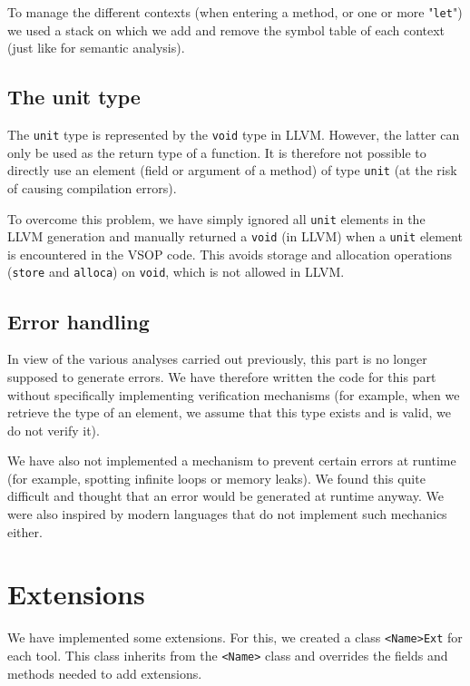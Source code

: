 \documentclass[a4paper, 12pt]{article}
\begin{document}
    To manage the different contexts (when entering a method, or one or more "\texttt{let}") we used a stack on which we add and remove the symbol table of each context (just like for semantic analysis).
    
    \subsection{The unit type}
    
    The \texttt{unit} type is represented by the \texttt{void} type in LLVM. However, the latter can only be used as the return type of a function. It is therefore not possible to directly use an element (field or argument of a method) of type \texttt{unit} (at the risk of causing compilation errors).
    
    To overcome this problem, we have simply ignored all \texttt{unit} elements in the LLVM generation and manually returned a \texttt{void} (in LLVM) when a \texttt{unit} element is encountered in the VSOP code. This avoids storage and allocation operations (\texttt{store} and \texttt{alloca}) on \texttt{void}, which is not allowed in LLVM.
    
    \subsection{Error handling}
    
    In view of the various analyses carried out previously, this part is no longer supposed to generate errors. We have therefore written the code for this part without specifically implementing verification mechanisms (for example, when we retrieve the type of an element, we assume that this type exists and is valid, we do not verify it).
    
    We have also not implemented a mechanism to prevent certain errors at runtime (for example, spotting infinite loops or memory leaks). We found this quite difficult and thought that an error would be generated at runtime anyway. We were also inspired by modern languages that do not implement such mechanics either.
    
    
    \section{Extensions}
    
    We have implemented some extensions. For this, we created a class \texttt{<Name>Ext} for each tool. This class inherits from the \texttt{<Name>} class and overrides the fields and methods needed to add extensions.
    
\end{document}
